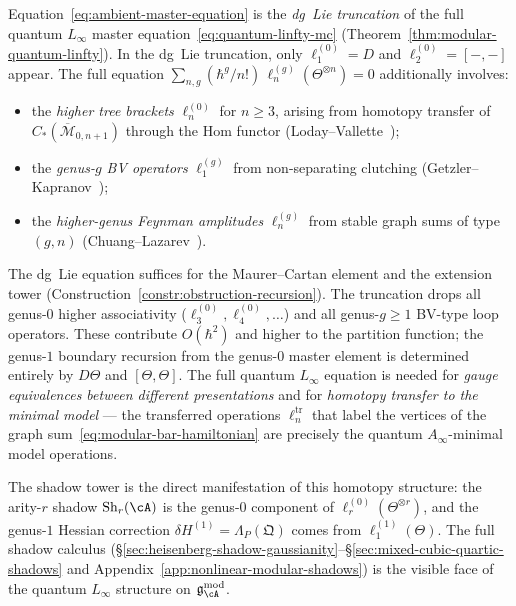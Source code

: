 \begin{remark}
\label{rem:dg-to-quantum-linfty}
Equation~\eqref{eq:ambient-master-equation} is the
\emph{dg~Lie truncation} of the full quantum $L_\infty$ master
equation~\eqref{eq:quantum-linfty-mc}
(Theorem~\ref{thm:modular-quantum-linfty}).  In the dg~Lie
truncation, only $\ell_1^{(0)} = D$ and $\ell_2^{(0)} = [-,-]$
appear.  The full equation
$\sum_{n,g} (\hbar^g/n!)\,\ell_n^{(g)}(\Theta^{\otimes n}) = 0$
additionally involves:
\begin{itemize}
\item the \emph{higher tree brackets} $\ell_n^{(0)}$ for $n \geq 3$,
arising from homotopy transfer of
$C_*(\overline{\mathcal{M}}_{0,n+1})$ through the Hom functor
(Loday--Vallette~\cite[Theorem~10.3.8]{LV12});
\item the \emph{genus-$g$ BV operators} $\ell_1^{(g)}$ from
non-separating clutching
(Getzler--Kapranov~\cite[\S5]{GeK98});
\item the \emph{higher-genus Feynman amplitudes} $\ell_n^{(g)}$
from stable graph sums of type $(g,n)$
(Chuang--Lazarev~\cite{CL10}).
\end{itemize}
The dg~Lie equation suffices for the Maurer--Cartan element and the
extension tower (Construction~\ref{constr:obstruction-recursion}).
The truncation drops all genus-$0$ higher associativity
($\ell_3^{(0)}, \ell_4^{(0)}, \ldots$) and all genus-$g \geq 1$
BV-type loop operators.  These contribute
$O(\hbar^2)$ and higher to the partition function; the genus-$1$
boundary recursion from the genus-$0$ master element is determined
entirely by $D\Theta$ and $[\Theta,\Theta]$.
The full quantum $L_\infty$ equation is needed for
\emph{gauge equivalences between different presentations} and for
\emph{homotopy transfer to the minimal model} --- the transferred
operations $\ell_n^{\mathrm{tr}}$ that label the vertices of the
graph sum~\eqref{eq:modular-bar-hamiltonian} are precisely the
quantum $A_\infty$-minimal model operations.

The shadow tower is the direct manifestation of this homotopy
structure: the arity-$r$ shadow $\operatorname{Sh}_r(\cA)$ is
the genus-$0$ component of $\ell_r^{(0)}(\Theta^{\otimes r})$,
and the genus-$1$ Hessian correction
$\delta H^{(1)} = \Lambda_P(\mathfrak{Q})$ comes from
$\ell_1^{(1)}(\Theta)$.  The full shadow calculus
(\S\ref{sec:heisenberg-shadow-gaussianity}--\S\ref{sec:mixed-cubic-quartic-shadows}
and Appendix~\ref{app:nonlinear-modular-shadows}) is the
visible face of the quantum $L_\infty$
structure on $\mathfrak{g}_{\cA}^{\mathrm{mod}}$.
\end{remark}


